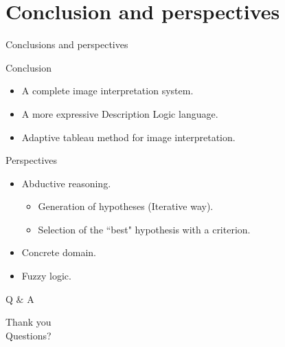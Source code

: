 \documentclass{beamer}
\begin{document}
\section{Conclusion and perspectives}
\begin{frame}{Conclusions and perspectives}
% 
\begin{block}{Conclusion}
 \begin{itemize}
  \item A complete image interpretation system.
  \item A more expressive Description Logic language.
  \item Adaptive tableau method for image interpretation.
 \end{itemize}
\end{block}

\begin{block}{Perspectives}
\begin{itemize}
 \item Abductive reasoning.
 \begin{itemize}
  \item Generation of hypotheses (Iterative way).
  \item Selection of the ``best" hypothesis with a criterion.
 \end{itemize}
 \item Concrete domain.
 \item Fuzzy logic.
\end{itemize}
\end{block}

% 
\end{frame}


\begin{frame}{Q $\&$ A}
\begin{center}
 Thank you\\

Questions?
\end{center}
\end{frame}
\end{document}
